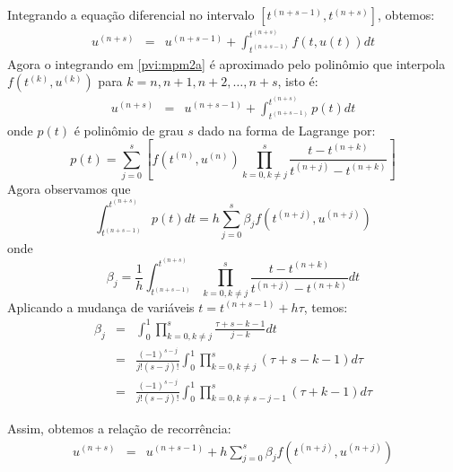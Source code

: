 Integrando a equação diferencial no intervalo $[t^{(n+s-1)},t^{(n+s)}]$, obtemos:
\begin{eqnarray}\label{pvi:mpm2a}
  u^{(n+s)}  &=& u^{(n+s-1)}  + \int_{t^{(n+s-1)}}^{t^{(n+s)}} f(t,u(t)) dt
\end{eqnarray}
 Agora o integrando em \eqref{pvi:mpm2a} é aproximado pelo polinômio que interpola $f(t^{(k)},u^{(k)})$ para $k = n, n+1, n+2, \ldots, n+s$, isto é:
\begin{eqnarray}\label{pvi:mpm2b}
  u^{(n+s)}  &=& u^{(n+s-1)}  + \int_{t^{(n+s-1)}}^{t^{(n+s)}} p(t) dt
\end{eqnarray}
onde $p(t)$ é polinômio de grau $s$ dado na forma de Lagrange por:
$$p(t)=\sum_{j=0}^{s}\left[f(t^{(n)},u^{(n)}) \prod_{k=0,k\neq j}^{s} \frac{t-t^{(n+k)}}{t^{(n+j)}-t^{(n+k)}}\right]$$
Agora observamos que
$$\int _{t^{(n+s-1)}}^{t^{(n+s)}} p(t) dt=h\sum_{j=0}^{s}\beta_j f(t^{(n+j)},u^{(n+j)})$$
onde 
\begin{equation*}
\beta_j= \frac{1}{h}\int_{t^{(n+s-1)}}^{t^{(n+s)}} \prod_{k=0,k\neq j}^{s} \frac{t-t^{(n+k)}}{t^{(n+j)}-t^{(n+k)}}dt
\end{equation*}
Aplicando a mudança de variáveis $t=t^{(n+s-1)}+h\tau$, temos:
\begin{eqnarray*}\label{pvi:betaj_m}
\beta_j&=& \int_0^1 \prod_{k=0,k\neq j}^{s} \frac{\tau+s-k-1}{j-k}dt\\
&=& \frac{(-1)^{s-j}}{j!(s-j)!}\int_{0}^{1} \prod_{k=0,k\neq j}^{s}(\tau+s-k-1)d\tau\\
&=& \frac{(-1)^{s-j}}{j!(s-j)!}\int_{0}^{1} \prod_{k=0,k\neq s-j-1}^{s}(\tau+k-1)d\tau
\end{eqnarray*}

Assim, obtemos a relação de recorrência:
\begin{eqnarray}\label{pvi:mam}
  u^{(n+s)}  &=& u^{(n+s-1)}  + h\sum_{j=0}^{s}\beta_j f(t^{(n+j)},u^{(n+j)})
\end{eqnarray}


